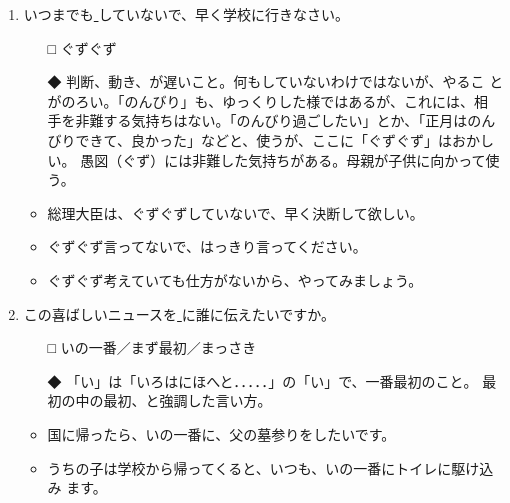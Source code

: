 \documentclass[
uplatex,
b5paper,
10pt,
dvipdfmx
]{jsbook}
\begin{document}
\begin{enumerate}
\item いつまでも\underline{      }していないで、早く学校に行きなさい。
\begin{itemize}
\item [□] ぐずぐず
\item [◆] 判断、動き、が遅いこと。何もしていないわけではないが、やるこ
      とがのろい。「のんびり」も、ゆっくりした様ではあるが、これには、相
      手を非難する気持ちはない。「のんびり過ごしたい」とか、「正月はのん
      びりできて、良かった」などと、使うが、ここに「ぐずぐず」はおかしい。
      愚図（ぐず）には非難した気持ちがある。母親が子供に向かって使う。
\end{itemize}
\begin{itemize}
\item 総理大臣は、ぐずぐずしていないで、早く決断して欲しい。
\item ぐずぐず言ってないで、はっきり言ってください。
\item ぐずぐず考えていても仕方がないから、やってみましょう。 
\end{itemize}

\item この喜ばしいニュースを\underline{     }に誰に伝えたいですか。
\begin{itemize}
\item[□]  いの一番／まず最初／まっさき
\item[◆] 「い」は「いろはにほへと．．．．．」の「い」で、一番最初のこと。
	  最初の中の最初、と強調した言い方。
\end{itemize}
\begin{itemize}
\item 国に帰ったら、いの一番に、父の墓参りをしたいです。
\item うちの子は学校から帰ってくると、いつも、いの一番にトイレに駆け込み
      ます。
\end{itemize}


\end{enumerate}
\end{document}
